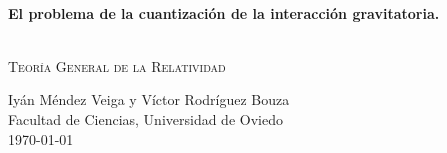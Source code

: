 \begin{titlepage}
\begin{center}


\HRule \\[0.4cm]
{ \huge \bfseries El problema de la cuantización de la interacción gravitatoria. \\[0.3cm] }

\HRule \\[1.5cm]

\textsc{\Large Teoría General de la Relatividad}\\[1cm]

\vfill

\large{Iyán Méndez Veiga y Víctor Rodríguez Bouza \\
Facultad de Ciencias, Universidad de Oviedo}
\\
{\today}

\end{center}
\end{titlepage}
